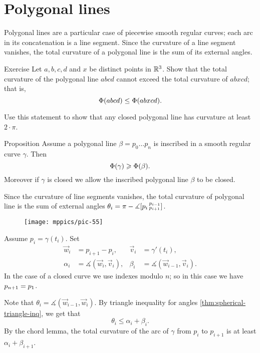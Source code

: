 \section{Polygonal lines} 

Polygonal lines are a particular case of piecewise smooth regular curves;
each arc in its concatenation is a line segment.
Since the curvature of a line segment vanishes, the total curvature of a polygonal line is the sum of its external angles.

\begin{thm}{Exercise}\label{ex:monotonic-tc}
Let $a,b,c,d$ and $x$ be distinct points in $\mathbb{R}^3$.
Show that the total curvature of the polygonal line $abcd$ cannot exceed the total curvature of $abxcd$; that is, 
\[\Phi({abcd}) \leq \Phi({abxcd}).\]

Use this statement to show that any closed polygonal line has curvature at least $2\cdot\pi$.
\end{thm}



\begin{thm}{Proposition}\label{prop:inscribed-total-curvature}
Assume a polygonal line $\beta=p_0\dots p_n$ is inscribed in a smooth regular curve $\gamma$.
Then 
\[\Phi({\gamma})\geqslant \Phi({\beta}).\]
Moreover if $\gamma$ is closed we allow the inscribed polygonal line $\beta$ to be closed.

\end{thm}

Since the curvature of line segments vanishes, 
the total curvature of polygonal line is the sum of external angles $\theta_i=\pi-
\measuredangle[p_i\,{}^{p_{i-1}}_{p_{i+1}}]$.

\begin{wrapfigure}{o}{40 mm}
\vskip-0mm
\centering
\texttt{[image: mppics/pic-55]}
\vskip0mm
\end{wrapfigure}

Assume $p_i=\gamma(t_i)$.
Set 
\begin{align*}
\vec w_i&=p_{i+1}-p_i,& \vec v_i&=\gamma'(t_i),
\\
\alpha_i&=\measuredangle(\vec w_i,\vec v_i),&\beta_i&=\measuredangle(\vec w_{i-1},\vec v_i).
\end{align*}
In the case of a closed curve we use indexes modulo $n$;
so in this case we have $p_{n+1}\z=p_1$.

Note that $\theta_i=\measuredangle(\vec w_{i-1},\vec w_i)$.
By triangle inequality for angles \ref{thm:spherical-triangle-inq}, we get that
\[\theta_i\le \alpha_i+\beta_i.\]
By the chord lemma, the total curvature of the arc of $\gamma$ from $p_i$ to $p_{i+1}$ is at least $\alpha_i+\beta_{i+1}$. 

